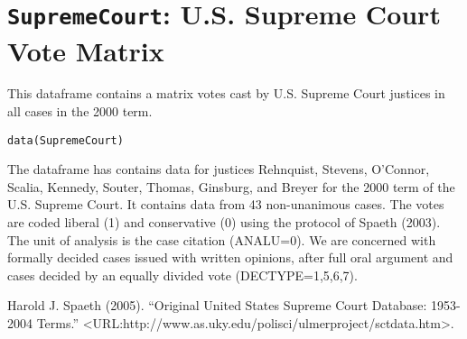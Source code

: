  \section{{\tt SupremeCourt}: U.S. Supreme Court Vote Matrix}\label{ss:SupremeCourt}
\begin{Description}\relax
This dataframe contains a matrix votes cast by U.S. Supreme Court
justices in all cases in the 2000 term.
\end{Description}
\begin{Usage}
\begin{verbatim}data(SupremeCourt)\end{verbatim}
\end{Usage}
\begin{Format}\relax
The dataframe has contains data for justices Rehnquist, Stevens,
O'Connor, Scalia, Kennedy, Souter, Thomas, Ginsburg, and Breyer
for the 2000 term of the U.S. Supreme Court.  It contains data
from 43 non-unanimous cases. The votes are coded liberal (1) and
conservative (0) using the protocol of Spaeth (2003).   The unit
of analysis is the case citation (ANALU=0).  We are concerned with
formally decided cases issued with written opinions, after full
oral argument and cases decided by an equally divided vote
(DECTYPE=1,5,6,7).
\end{Format}
\begin{Source}\relax
Harold J. Spaeth (2005). ``Original United States Supreme Court
Database:  1953-2004 Terms.'' 
<URL:http://www.as.uky.edu/polisci/ulmerproject/sctdata.htm>.
\end{Source}



